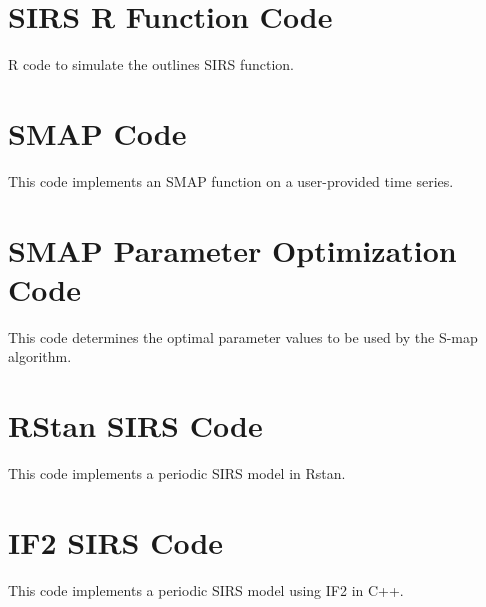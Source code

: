 
\section{SIRS R Function Code}

	R code to simulate the outlines SIRS function.

	

\section{SMAP Code}

	This code implements an SMAP function on a user-provided time series.

	

\section{SMAP Parameter Optimization Code}

	This code determines the optimal parameter values to be used by the S-map algorithm.

	

\section{RStan SIRS Code}

    This code implements a periodic SIRS model in Rstan.

    

\section{IF2 SIRS Code}

    This code implements a periodic SIRS model using IF2 in C++.

    